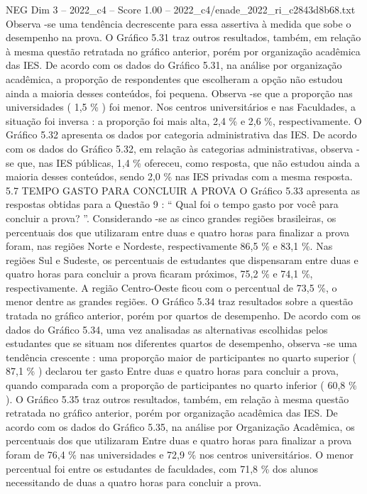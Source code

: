 \begin{textsample}{NEG Dim 3 – 2022\_c4 – Score 1.00 – 2022\_c4/enade\_2022\_ri\_c2843d8b68.txt}
Observa -se uma tendência decrescente para essa assertiva à medida que sobe o desempenho na prova.
O Gráfico 5.31 traz outros resultados, também, em relação à mesma questão retratada no gráfico anterior, porém por organização acadêmica das IES.
De acordo com os dados do Gráfico 5.31, na análise por organização acadêmica, a proporção de respondentes que escolheram a opção não estudou ainda a maioria desses conteúdos, foi pequena.
Observa -se que a proporção nas universidades ( 1,5 \% ) foi menor.
Nos centros universitários e nas Faculdades, a situação foi inversa : a proporção foi mais alta, 2,4 \% e 2,6 \%, respectivamente.
O Gráfico 5.32 apresenta os dados por categoria administrativa das IES.
De acordo com os dados do Gráfico 5.32, em relação às categorias administrativas, observa -se que, nas IES públicas, 1,4 \% ofereceu, como resposta, que não estudou ainda a maioria desses conteúdos, sendo 2,0 \% nas IES privadas com a mesma resposta. 5.7 TEMPO GASTO PARA CONCLUIR A PROVA O Gráfico 5.33 apresenta as respostas obtidas para a Questão 9 : “ Qual foi o tempo gasto por você para concluir a prova? ”.
Considerando -se as cinco grandes regiões brasileiras, os percentuais dos que utilizaram entre duas e quatro horas para finalizar a prova foram, nas regiões Norte e Nordeste, respectivamente 86,5 \% e 83,1 \%.
Nas regiões Sul e Sudeste, os percentuais de estudantes que dispensaram entre duas e quatro horas para concluir a prova ficaram próximos, 75,2 \% e 74,1 \%, respectivamente.
A região Centro-Oeste ficou com o percentual de 73,5 \%, o menor dentre as grandes regiões.
O Gráfico 5.34 traz resultados sobre a questão tratada no gráfico anterior, porém por quartos de desempenho.
De acordo com os dados do Gráfico 5.34, uma vez analisadas as alternativas escolhidas pelos estudantes que se situam nos diferentes quartos de desempenho, observa -se uma tendência crescente : uma proporção maior de participantes no quarto superior ( 87,1 \% ) declarou ter gasto Entre duas e quatro horas para concluir a prova, quando comparada com a proporção de participantes no quarto inferior ( 60,8 \% ).
O Gráfico 5.35 traz outros resultados, também, em relação à mesma questão retratada no gráfico anterior, porém por organização acadêmica das IES.
De acordo com os dados do Gráfico 5.35, na análise por Organização Acadêmica, os percentuais dos que utilizaram Entre duas e quatro horas para finalizar a prova foram de 76,4 \% nas universidades e 72,9 \% nos centros universitários.
O menor percentual foi entre os estudantes de faculdades, com 71,8 \% dos alunos necessitando de duas a quatro horas para concluir a prova.

\end{textsample}
